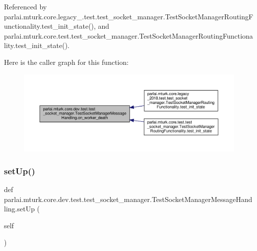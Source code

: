 Referenced by parlai.\+mturk.\+core.\+legacy\+\_.\+test.\+test\+\_\+socket\+\_\+manager.\+Test\+Socket\+Manager\+Routing\+Functionality.\+test\+\_\+init\+\_\+state(), and parlai.\+mturk.\+core.\+test.\+test\+\_\+socket\+\_\+manager.\+Test\+Socket\+Manager\+Routing\+Functionality.\+test\+\_\+init\+\_\+state().

Here is the caller graph for this function\+:
\nopagebreak
\begin{figure}[H]
\begin{center}
\leavevmode
\includegraphics[width=350pt]{classparlai_1_1mturk_1_1core_1_1dev_1_1test_1_1test__socket__manager_1_1TestSocketManagerMessageHandling_a73cd339bf49a155ecef810eb881bac47_icgraph}
\end{center}
\end{figure}
\mbox{\label{classparlai_1_1mturk_1_1core_1_1dev_1_1test_1_1test__socket__manager_1_1TestSocketManagerMessageHandling_a822b338ce726dcf695ef59db4498ab28}} 
\subsubsection{\texorpdfstring{set\+Up()}{setUp()}}
{\footnotesize\ttfamily def parlai.\+mturk.\+core.\+dev.\+test.\+test\+\_\+socket\+\_\+manager.\+Test\+Socket\+Manager\+Message\+Handling.\+set\+Up (\begin{DoxyParamCaption}\item[{}]{self }\end{DoxyParamCaption})}



